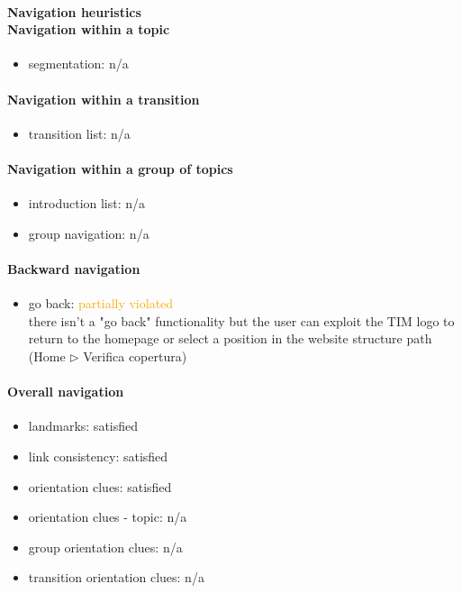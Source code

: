 \begin{enumerate}
	\paragraph*{Navigation heuristics \\ Navigation within a topic}
	\begin{itemize}
		\item segmentation: n/a
	\end{itemize}	
	
	\paragraph*{Navigation within a transition}
	\begin{itemize}
		\item transition list: n/a
	\end{itemize}
	
	\paragraph*{Navigation within a group of topics}
	\begin{itemize}
		\item introduction list: n/a
		\item group navigation: n/a
	\end{itemize}
	
	\paragraph*{Backward navigation}
	\begin{itemize}
		\item go back: \textcolor {orange}{partially violated}\\
		there isn't a "go back" functionality but the user can exploit the TIM logo to return to the homepage or select a position in the website structure path (Home $\triangleright$ Verifica copertura)
	\end{itemize}
	
	\paragraph*{Overall navigation}
	\begin{itemize}
		\item landmarks: satisfied
		\item link consistency: satisfied
		\item orientation clues: satisfied
		\item orientation clues - topic: n/a
		\item group orientation clues: n/a
		\item transition orientation clues: n/a
	\end{itemize}	
	

\end{enumerate}
